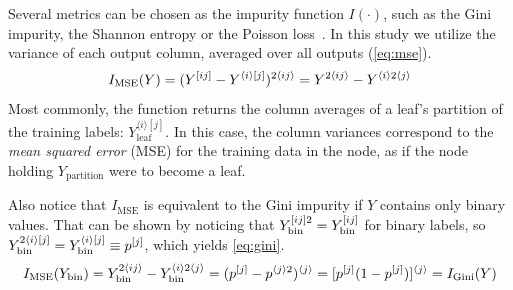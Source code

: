 Several metrics can be chosen as the impurity function $I(\cdot)$, such as the Gini impurity, the Shannon entropy or the Poisson loss~\cite{}. In this study we utilize the variance of each output column, averaged over all outputs (\autoref{eq:mse}). 
%
%
\begin{equation}
    I_\text{MSE}(Y)
        = (Y^{[ij]} - Y^{\langle i\rangle[j]})^{2\langle ij\rangle}
        = Y^{2\langle ij\rangle} - Y^{\langle i\rangle 2\langle j\rangle}
    \label{eq:mse}
\end{equation}
%
Most commonly, the  function returns the column averages of a leaf's partition of the training labels: $Y_\text{leaf}^{\langle i\rangle[j]}$.
In this case, the column variances correspond to the \emph{mean squared error} (MSE) for the training data in the node, as if the node holding $Y_\text{partition}$ were to become a leaf.
%
%

Also notice that $I_\text{MSE}$ is equivalent to the Gini impurity if $Y$ contains only binary values. That can be shown by noticing that $Y_\text{bin}^{[ij]2} = Y_\text{bin}^{[ij]}$ for binary labels, so $Y_\text{bin}^{2\langle i\rangle[j]}=Y_\text{bin}^{\langle i\rangle [j]}\equiv p^{[j]}$, which yields \autoref{eq:gini}.
%
\begin{equation}
    I_\text{MSE}(Y_\text{bin})
        = Y_\text{bin}^{2\langle ij\rangle} - Y_\text{bin}^{\langle i\rangle2\langle j\rangle}
        = (p^{[j]}  - p^{\langle j\rangle 2})^{\langle j \rangle}
        = [p^{[j]}(1 - p^{[j]})]^{\langle j \rangle}
    = I_\text{Gini}(Y)
    \label{eq:gini}
\end{equation}

